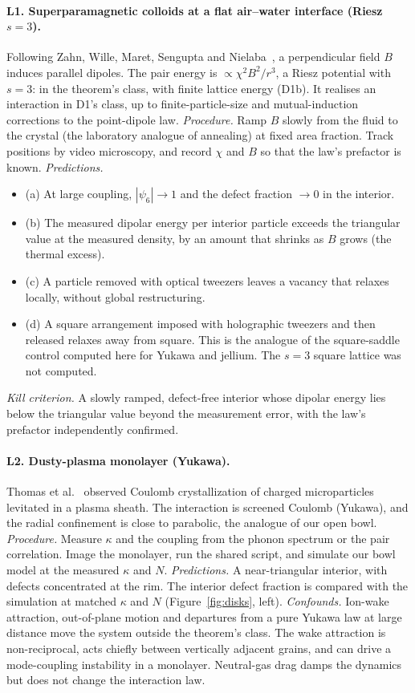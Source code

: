 \documentclass[11pt]{article}
\begin{document}
\paragraph{L1. Superparamagnetic colloids at a flat air--water interface (Riesz $s=3$).} Following Zahn, Wille,
Maret, Sengupta and Nielaba~\cite{zahn}, a perpendicular field $B$ induces parallel dipoles. The pair energy is
$\propto\chi^2B^2/r^3$, a Riesz potential with $s=3$: in the theorem's class, with finite lattice energy (D1b). It
realises an interaction in D1's class, up to finite-particle-size and mutual-induction corrections to the point-dipole
law.
\emph{Procedure.} Ramp $B$ slowly from the fluid to the crystal (the laboratory analogue of annealing) at fixed area
fraction. Track positions by video microscopy, and record $\chi$ and $B$ so that the law's prefactor is known.
\emph{Predictions.}
\begin{itemize}
\item (a) At large coupling, $|\psi_6|\to1$ and the defect fraction $\to0$ in the interior.
\item (b) The measured dipolar energy per interior particle exceeds the triangular value at the measured density, by
an amount that shrinks as $B$ grows (the thermal excess).
\item (c) A particle removed with optical tweezers leaves a vacancy that relaxes locally, without global
restructuring.
\item (d) A square arrangement imposed with holographic tweezers and then released relaxes away from square. This is
the analogue of the square-saddle control computed here for Yukawa and jellium. The $s=3$ square lattice was not
computed.
\end{itemize}
\emph{Kill criterion.} A slowly ramped, defect-free interior whose dipolar energy lies below the triangular value
beyond the measurement error, with the law's prefactor independently confirmed.

\paragraph{L2. Dusty-plasma monolayer (Yukawa).} Thomas et al.~\cite{thomas} observed Coulomb crystallization of
charged microparticles levitated in a plasma sheath. The interaction is screened Coulomb (Yukawa), and the radial
confinement is close to parabolic, the analogue of our open bowl.
\emph{Procedure.} Measure $\kappa$ and the coupling from the phonon spectrum or the pair correlation. Image the
monolayer, run the shared script, and simulate our bowl model at the measured $\kappa$ and $N$.
\emph{Predictions.} A near-triangular interior, with defects concentrated at the rim. The interior defect fraction is
compared with the simulation at matched $\kappa$ and $N$ (Figure~\ref{fig:disks}, left).
\emph{Confounds.} Ion-wake attraction, out-of-plane motion and departures from a pure Yukawa law at large distance
move the system outside the theorem's class. The wake attraction is non-reciprocal, acts chiefly between vertically
adjacent grains, and can drive a mode-coupling instability in a monolayer. Neutral-gas drag damps the dynamics but
does not change the interaction law.
\end{document}
